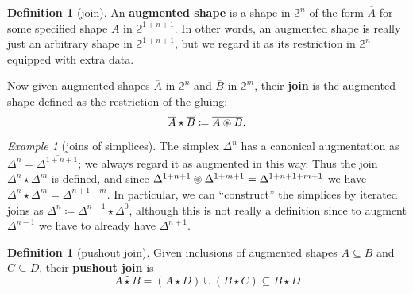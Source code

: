 \documentclass{amsart}
\theoremstyle{plain}
\theoremstyle{definition}
\newtheorem{defn}[thm]{Definition}
\theoremstyle{remark}
\newtheorem{ex}[thm]{Example}
\numberwithin{equation}{section}
\newcommand{\defeq}{\coloneqq}
\newcommand{\restr}[1]{\overline{#1}}
\newcommand{\two}{\mathbb{2}}
\newcommand{\join}{\star}
\newcommand{\pojoin}{\mathbin{\widehat{\join}}}
\begin{document}
\begin{defn}[join]
  An \textbf{augmented shape} is a shape in $\two^n$ of the form $\restr{A}$ for some specified shape $A$ in $\two^{1+n+1}$.
  In other words, an augmented shape is really just an arbitrary shape in $\two^{1+n+1}$, but we regard it as its restriction in $\two^n$ equipped with extra data.

  Now given augmented shapes $\restr{A}$ in $\two^n$ and $\restr{B}$ in $\two^m$, their \textbf{join} is the augmented shape defined as the restriction of the gluing:
  \[ \restr{A} \join \restr{B} \defeq \restr{A \oast B}.\]
\end{defn}

\begin{ex}[joins of simplices]
  The simplex $\Delta^n$ has a canonical augmentation as $\Delta^n = \restr{\Delta^{1+n+1}}$; we always regard it as augmented in this way.
  Thus the join $\Delta^n \join \Delta^m$ is defined, and since $\Delta^{1+n+1} \oast \Delta^{1+m+1} = \Delta^{1+n+1+m+1}$ we have $\Delta^n \join \Delta^m = \Delta^{n+1+m}$.
  In particular, we can ``construct'' the simplices by iterated joins as $\Delta^n \defeq \Delta^{n-1} \star \Delta^0$, although this is not really a definition since to augment $\Delta^{n-1}$ we have to already have $\Delta^{n+1}$.
\end{ex}

\begin{defn}[pushout join]
  Given inclusions of augmented shapes $A\subseteq B$ and $C\subseteq D$, their \textbf{pushout join} is
  \[ A \pojoin B = (A \join D) \cup (B\join C) \subseteq B\join D \]
\end{defn}
\end{document}
